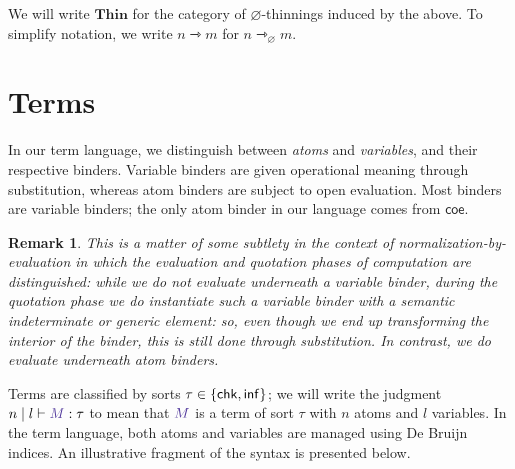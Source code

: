 \documentclass{article}
\DeclarePairedDelimiter\Braces{\lbrace}{\rbrace}
\newtheorem{remark}{Remark}
\newcommand\FmtKwd[1]{\mathsf{#1}}
\newcommand\XThin[3]{{#2}\rightarrowtriangle_{#1}{#3}}
\newcommand\Thin[2]{{#1}\rightarrowtriangle{#2}}
\newcommand\THIN{\mathbf{Thin}}
\newcommand\SortChk{\FmtKwd{chk}}
\newcommand\SortInf{\FmtKwd{inf}}
\newcommand\FmtTm[1]{{\color{Violet}#1}}
\newcommand\IsTm[4]{{#1}\mid{#2}\vdash\FmtTm{#3}:{#4}}
\begin{document}
We will write $\THIN$ for the category of $\varnothing$-thinnings
induced by the above. To simplify notation, we write $\Thin{n}{m}$ for
$\XThin{\varnothing}{n}{m}$.

\section{Terms}


In our term language, we distinguish between \emph{atoms} and
\emph{variables}, and their respective binders. Variable binders are
given operational meaning through substitution, whereas atom binders
are subject to open evaluation. Most binders are variable binders; the
only atom binder in our language comes from $\FmtKwd{coe}$.

\begin{remark}
  This is a matter of some subtlety in the context of
  \emph{normalization-by-evaluation} in which the evaluation and
  quotation phases of computation are distinguished: while we do not
  evaluate underneath a variable binder, during the quotation phase we
  \emph{do} instantiate such a variable binder with a semantic
  indeterminate or generic element: so, even though we end up
  transforming the interior of the binder, this is still done through
  substitution. In contrast, we do evaluate underneath atom binders.
\end{remark}

Terms are classified by sorts $\tau\in\Braces*{\SortChk,\SortInf}$; we
will write the judgment $\IsTm{n}{l}{M}{\tau}$ to mean that
$\FmtTm{M}$ is a term of sort $\tau$ with $n$ atoms and $l$
variables. In the term language, both atoms and variables are managed
using De Bruijn indices. An illustrative fragment of the syntax is
presented below.
\end{document}
